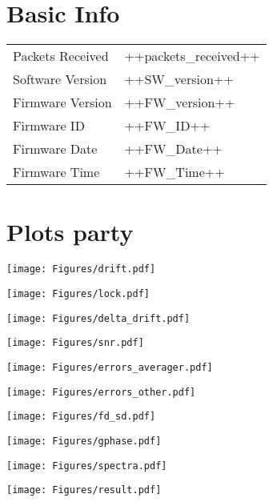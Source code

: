 
\section{Basic Info}

\begin{tabular}{p{5cm}p{5cm}}
    Packets Received              & ++packets_received++                                         \\
    Software Version              & ++SW_version++                                               \\
    Firmware Version              & ++FW_version++                                               \\
    Firmware ID                   & ++FW_ID++                                                    \\
    Firmware Date                 & ++FW_Date++                                                  \\
    Firmware Time                 & ++FW_Time++                                                  \\
\end{tabular}


\section{Plots party}

\texttt{[image: Figures/drift.pdf]}

\texttt{[image: Figures/lock.pdf]}

\texttt{[image: Figures/delta\_drift.pdf]}

\texttt{[image: Figures/snr.pdf]}

\texttt{[image: Figures/errors\_averager.pdf]}

\texttt{[image: Figures/errors\_other.pdf]}

\texttt{[image: Figures/fd\_sd.pdf]}

\texttt{[image: Figures/gphase.pdf]}

\texttt{[image: Figures/spectra.pdf]}

\texttt{[image: Figures/result.pdf]}


